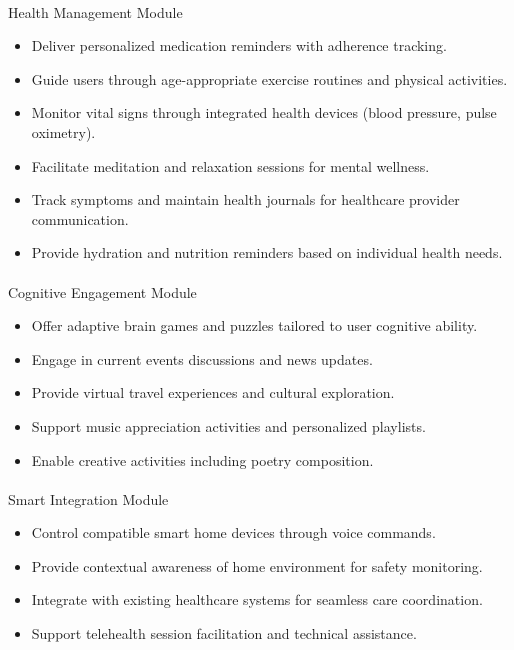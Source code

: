 \documentclass[
  letterpaper,
  DIV=11,
  numbers=noendperiod]{scrartcl}
\makeatletter
\let\oldparagraph\paragraph
\renewcommand{\paragraph}{
    \@ifstar
      \xxxParagraphStar
      \xxxParagraphNoStar
  }
\newcommand{\xxxParagraphStar}[1]{\oldparagraph*{#1}\mbox{}}
\newcommand{\xxxParagraphNoStar}[1]{\oldparagraph{#1}\mbox{}}
\providecommand{\tightlist}{%
  \setlength{\itemsep}{0pt}\setlength{\parskip}{0pt}}\usepackage{longtable,booktabs,array}
\makeatother
\begin{document}
\paragraph{Health Management Module}\label{health-management-module}

\begin{itemize}
\tightlist
\item
  Deliver personalized medication reminders with adherence tracking.
\item
  Guide users through age-appropriate exercise routines and physical
  activities.
\item
  Monitor vital signs through integrated health devices (blood pressure,
  pulse oximetry).
\item
  Facilitate meditation and relaxation sessions for mental wellness.
\item
  Track symptoms and maintain health journals for healthcare provider
  communication.
\item
  Provide hydration and nutrition reminders based on individual health
  needs.
\end{itemize}

\paragraph{Cognitive Engagement
Module}\label{cognitive-engagement-module}

\begin{itemize}
\tightlist
\item
  Offer adaptive brain games and puzzles tailored to user cognitive
  ability.
\item
  Engage in current events discussions and news updates.
\item
  Provide virtual travel experiences and cultural exploration.
\item
  Support music appreciation activities and personalized playlists.
\item
  Enable creative activities including poetry composition.
\end{itemize}

\paragraph{Smart Integration Module}\label{smart-integration-module}

\begin{itemize}
\tightlist
\item
  Control compatible smart home devices through voice commands.
\item
  Provide contextual awareness of home environment for safety
  monitoring.
\item
  Integrate with existing healthcare systems for seamless care
  coordination.
\item
  Support telehealth session facilitation and technical assistance.
\end{itemize}
\end{document}

